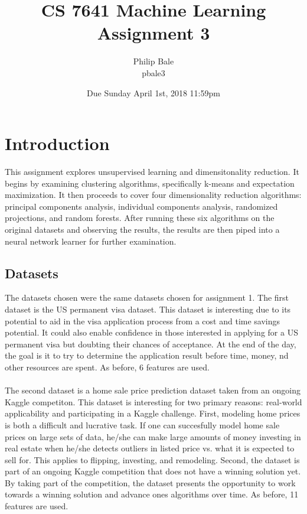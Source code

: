 \documentclass[h]{article}
\title{CS 7641 Machine Learning \\ Assignment 3}
\date{Due Sunday April 1st, 2018 11:59pm}
\author{Philip Bale \\ pbale3}
\begin{document}
\maketitle

\section*{Introduction}  
This assignment explores unsupervised learning and dimensitonality reduction.  
It begins by examining clustering algorithms, specifically k-means and 
expectation maximization.  It then proceeds to cover four dimensionality 
reduction algorithms: principal components analysis, individual components 
analysis, randomized projections, and random forests.  After running these six 
algorithms on the original datasets and observing the results, the results are 
then piped into a neural network learner for further examination.

\subsection*{Datasets}  
The datasets chosen were the same datasets chosen for assignment 1.  The first dataset is the US 
permanent visa dataset.  This dataset is interesting due to its potential to aid in the visa application process 
from a cost and time savings potential. It could also enable confidence in those interested in applying for a 
US permanent visa but doubting their chances of acceptance. 
At the end of the day, the goal is it to try to determine the application result before time, money, 
nd other resources are spent.   As before, 6 features are used. 
\\  \\
The second dataset is a home sale price prediction dataset taken from an ongoing 
Kaggle competiton.  This dataset is interesting for two primary reasons: real-world applicability and participating in a Kaggle challenge.
 First, modeling home prices is both a difficult and lucrative task. 
 If one can succesfully model home sale prices on large sets of data, he/she can make large amounts of money 
 investing in real estate when he/she detects outliers in listed price vs. what it is expected to sell for. 
 This applies to flipping, investing, and remodeling. 
 Second, the dataset is part of an ongoing Kaggle competition that does not have a winning solution yet.
  By taking part of the competition, the dataset presents the opportunity to work towards a winning solution 
  and advance ones algorithms over time. As before, 11 features are used. 
\end{document}
